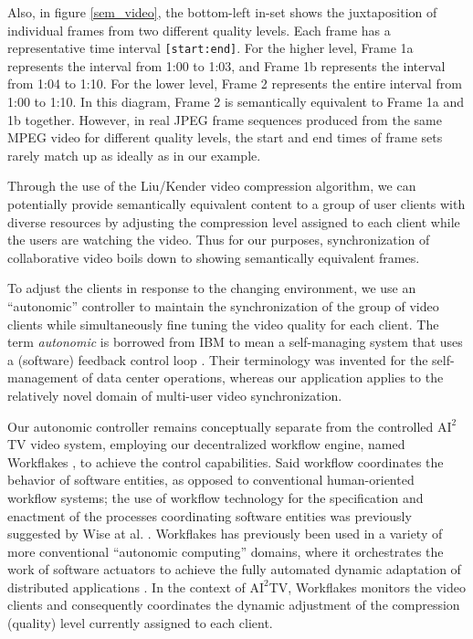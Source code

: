 \documentclass{sig-alternate}
\begin{document}
Also, in figure \ref{sem_video}, the bottom-left in-set shows the
juxtaposition of individual frames from two different quality levels.
Each frame has a representative time interval \texttt{[start:end]}.
For the higher level, Frame 1a represents the interval from 1:00 to
1:03, and Frame 1b represents the interval from 1:04 to 1:10.  For the
lower level, Frame 2 represents the entire interval from 1:00 to 1:10.
In this diagram, Frame 2 is semantically equivalent to Frame 1a and 1b
together.  However, in real JPEG frame sequences produced from the
same MPEG video for different quality levels, the start and end times
of frame sets rarely match up as ideally as in our example.

Through the use of the Liu/Kender video compression algorithm, we can
potentially provide semantically equivalent content to a group of user
clients with diverse resources by adjusting the compression level
assigned to each client while the users are watching the video.  Thus
for our purposes, synchronization of collaborative video boils down to
showing semantically equivalent frames.

To adjust the clients in response to the changing environment, we use
an ``autonomic'' controller to maintain the synchronization of the
group of video clients while simultaneously fine tuning the video
quality for each client.  The term \textit{autonomic} is borrowed from
IBM to mean a self-managing system that uses a (software) feedback
control loop \cite{IBM}.  Their terminology was invented for the
self-management of data center operations, whereas our application
applies to the relatively novel domain of multi-user video
synchronization.  

Our autonomic controller remains conceptually separate from the
controlled $\mathrm{AI}^2$TV video system, employing our decentralized
workflow engine, named Workflakes \cite{ValettoThesis}, to achieve the
control capabilities.  Said workflow coordinates the behavior of
software entities, as opposed to conventional human-oriented workflow
systems; the use of workflow technology for the specification and
enactment of the processes coordinating software entities was
previously suggested by Wise at al. \cite{OSTERWEIL}.  Workflakes has
previously been used in a variety of more conventional ``autonomic
computing'' domains, where it orchestrates the work of software
actuators to achieve the fully automated dynamic adaptation of
distributed applications \cite{ICSE,AMS,AMSJournal}.  In the context
of $\mathrm{AI}^2$TV, Workflakes monitors the video clients and
consequently coordinates the dynamic adjustment of the compression
(quality) level currently assigned to each client.
\end{document}
